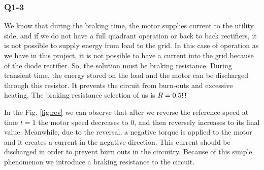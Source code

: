 \subsubsection{Q1-3}


We know that during the braking time, the motor supplies current to the utility side, and if we do not have a full quadrant operation or back to back rectifiers, it is not possible to supply energy from load to the grid. In this case of operation as we have in this project, it is not possible to have a current into the grid because of the diode rectifier. So, the solution must be braking resistance. During transient time, the energy stored on the load and the motor can be discharged through this resistor. It prevents the circuit from burn-outs and excessive heating. The braking resistance selection of us is $R = 0.5 \ohm$

In the Fig. \ref{fig:rev} we can observe that after we reverse the reference speed at time $t=1$ the motor speed decreases to 0, and then reversely increases to its final value. Meanwhile, due to the reversal, a negative torque is applied to the motor and it creates a current in the negative direction. This current should be discharged in order to prevent burn outs in the circuitry. Because of this simple phenomenon we introduce a braking resistance to the circuit.

